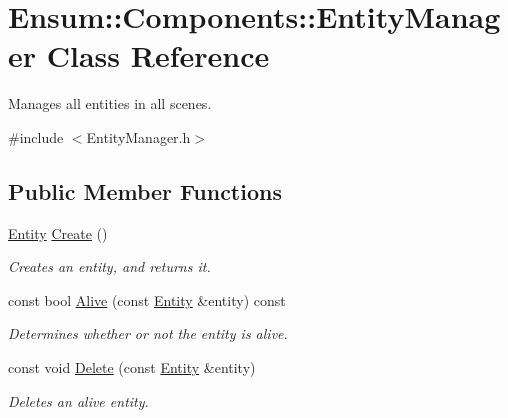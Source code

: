 \hypertarget{class_ensum_1_1_components_1_1_entity_manager}{}\section{Ensum\+:\+:Components\+:\+:Entity\+Manager Class Reference}
\label{class_ensum_1_1_components_1_1_entity_manager}


Manages all entities in all scenes.  




{\ttfamily \#include $<$Entity\+Manager.\+h$>$}

\subsection*{Public Member Functions}
\begin{DoxyCompactItemize}
\item 
\hyperlink{struct_ensum_1_1_components_1_1_entity}{Entity} \hyperlink{class_ensum_1_1_components_1_1_entity_manager_a15c2795c73d625bcc2399bf59cea64b5}{Create} ()\hypertarget{class_ensum_1_1_components_1_1_entity_manager_a15c2795c73d625bcc2399bf59cea64b5}{}\label{class_ensum_1_1_components_1_1_entity_manager_a15c2795c73d625bcc2399bf59cea64b5}

\begin{DoxyCompactList}\small\item\em Creates an entity, and returns it. \end{DoxyCompactList}\item 
const bool \hyperlink{class_ensum_1_1_components_1_1_entity_manager_aa30d3768a9f92b138a52b7ac7c6045cc}{Alive} (const \hyperlink{struct_ensum_1_1_components_1_1_entity}{Entity} \&entity) const \hypertarget{class_ensum_1_1_components_1_1_entity_manager_aa30d3768a9f92b138a52b7ac7c6045cc}{}\label{class_ensum_1_1_components_1_1_entity_manager_aa30d3768a9f92b138a52b7ac7c6045cc}

\begin{DoxyCompactList}\small\item\em Determines whether or not the entity is alive. \end{DoxyCompactList}\item 
const void \hyperlink{class_ensum_1_1_components_1_1_entity_manager_aaa8e8f7e613b8b8d8b707dd80a43aec5}{Delete} (const \hyperlink{struct_ensum_1_1_components_1_1_entity}{Entity} \&entity)\hypertarget{class_ensum_1_1_components_1_1_entity_manager_aaa8e8f7e613b8b8d8b707dd80a43aec5}{}\label{class_ensum_1_1_components_1_1_entity_manager_aaa8e8f7e613b8b8d8b707dd80a43aec5}

\begin{DoxyCompactList}\small\item\em Deletes an alive entity. \end{DoxyCompactList}\end{DoxyCompactItemize}
